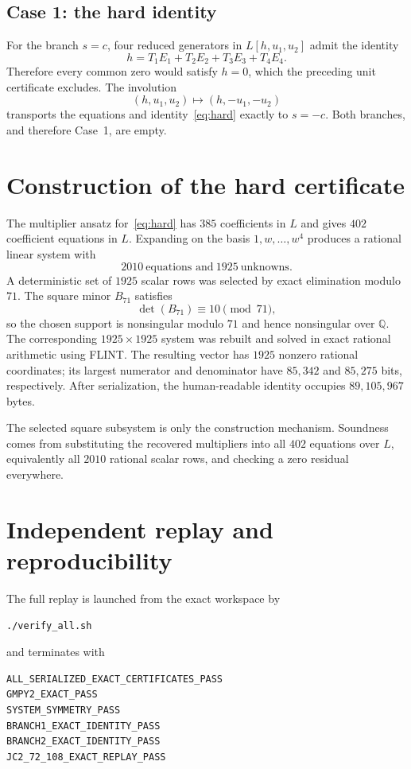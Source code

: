 \documentclass[11pt,a4paper]{article}
\theoremstyle{remark}
\newcommand{\Q}{\mathbb{Q}}
\begin{document}
\subsection{Case 1: the hard identity}

For the branch $s=c$, four reduced generators in $L[h,u_1,u_2]$ admit the identity
\begin{equation}\label{eq:hard}
\boxed{h=T_1E_1+T_2E_2+T_3E_3+T_4E_4.}
\end{equation}
Therefore every common zero would satisfy $h=0$, which the preceding unit certificate excludes. The involution
\[
(h,u_1,u_2)\longmapsto(h,-u_1,-u_2)
\]
transports the equations and identity~\eqref{eq:hard} exactly to $s=-c$. Both branches, and therefore Case~1, are empty.

\section{Construction of the hard certificate}

The multiplier ansatz for~\eqref{eq:hard} has $385$ coefficients in $L$ and gives $402$ coefficient equations in $L$. Expanding on the basis $1,w,\ldots,w^4$ produces a rational linear system with
\[
2010\ \text{equations and}\ 1925\ \text{unknowns}.
\]
A deterministic set of $1925$ scalar rows was selected by exact elimination modulo $71$. The square minor $B_{71}$ satisfies
\[
\det(B_{71})\equiv10\pmod{71},
\]
so the chosen support is nonsingular modulo $71$ and hence nonsingular over $\Q$. The corresponding $1925\times1925$ system was rebuilt and solved in exact rational arithmetic using FLINT. The resulting vector has $1925$ nonzero rational coordinates; its largest numerator and denominator have $85{,}342$ and $85{,}275$ bits, respectively. After serialization, the human-readable identity occupies $89{,}105{,}967$ bytes.

The selected square subsystem is only the construction mechanism. Soundness comes from substituting the recovered multipliers into all $402$ equations over $L$, equivalently all $2010$ rational scalar rows, and checking a zero residual everywhere.

\section{Independent replay and reproducibility}

The full replay is launched from the exact workspace by
\begin{verbatim}
./verify_all.sh
\end{verbatim}
and terminates with
\begin{verbatim}
ALL_SERIALIZED_EXACT_CERTIFICATES_PASS
GMPY2_EXACT_PASS
SYSTEM_SYMMETRY_PASS
BRANCH1_EXACT_IDENTITY_PASS
BRANCH2_EXACT_IDENTITY_PASS
JC2_72_108_EXACT_REPLAY_PASS
\end{verbatim}
\end{document}
